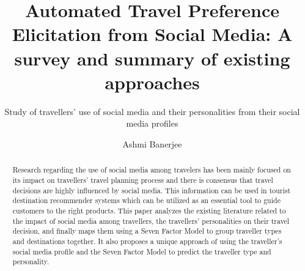 \documentclass[sigconf]{acmart}
\begin{document}
\title{Automated Travel Preference Elicitation from Social Media: A survey and summary of existing approaches}
\subtitle{Study of travellers' use of social media and their personalities from their social media profiles}

\author{Ashmi Banerjee}

\renewcommand{\shortauthors}{Ashmi Banerjee}


\begin{abstract}
Research regarding the use of social media among travelers has been mainly focused on its impact on travellers' travel planning process and there is consensus that travel decisions are highly influenced by social media. This information can be used in tourist destination recommender systems which can be utilized as an essential tool to guide customers to the right products. This paper analyzes the existing literature related to the impact of social media among travellers, the travellers' personalities on their travel decision, and finally maps them using a Seven Factor Model to group traveller types and destinations together.
It also proposes a unique approach of using the traveller's social media profile and the Seven Factor Model to predict the traveller type and personality.


\end{abstract}


\maketitle






\end{document}
